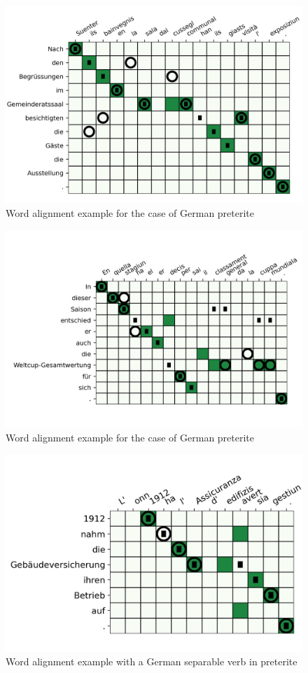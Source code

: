\begin{figure}
\includegraphics{graphics/alignments/example3.png}
\caption{Word alignment example for the case of German preterite}\label{fig:pret1}
\end{figure}

\begin{figure}
\includegraphics{graphics/alignments/example-pret.png}
\caption{Word alignment example for the case of German preterite}\label{fig:pret2}
\end{figure}

\begin{figure}
	\includegraphics{graphics/alignments/109.png}
	\caption{Word alignment example with a German separable verb in preterite}
	\label{fig:109-1912-nahm}
\end{figure}


